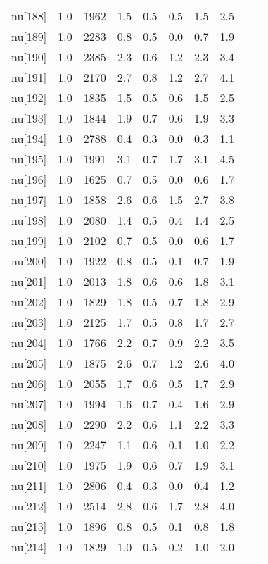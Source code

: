 \begin{longtable}{lrrrrrrr p{} | p{} |}
  nu[188] & 1.0 & 1962 & 1.5 & 0.5 & 0.5 & 1.5 & 2.5 \\ 
  nu[189] & 1.0 & 2283 & 0.8 & 0.5 & 0.0 & 0.7 & 1.9 \\ 
  nu[190] & 1.0 & 2385 & 2.3 & 0.6 & 1.2 & 2.3 & 3.4 \\ 
  nu[191] & 1.0 & 2170 & 2.7 & 0.8 & 1.2 & 2.7 & 4.1 \\ 
  nu[192] & 1.0 & 1835 & 1.5 & 0.5 & 0.6 & 1.5 & 2.5 \\ 
  nu[193] & 1.0 & 1844 & 1.9 & 0.7 & 0.6 & 1.9 & 3.3 \\ 
  nu[194] & 1.0 & 2788 & 0.4 & 0.3 & 0.0 & 0.3 & 1.1 \\ 
  nu[195] & 1.0 & 1991 & 3.1 & 0.7 & 1.7 & 3.1 & 4.5 \\ 
  nu[196] & 1.0 & 1625 & 0.7 & 0.5 & 0.0 & 0.6 & 1.7 \\ 
  nu[197] & 1.0 & 1858 & 2.6 & 0.6 & 1.5 & 2.7 & 3.8 \\ 
  nu[198] & 1.0 & 2080 & 1.4 & 0.5 & 0.4 & 1.4 & 2.5 \\ 
  nu[199] & 1.0 & 2102 & 0.7 & 0.5 & 0.0 & 0.6 & 1.7 \\ 
  nu[200] & 1.0 & 1922 & 0.8 & 0.5 & 0.1 & 0.7 & 1.9 \\ 
  nu[201] & 1.0 & 2013 & 1.8 & 0.6 & 0.6 & 1.8 & 3.1 \\ 
  nu[202] & 1.0 & 1829 & 1.8 & 0.5 & 0.7 & 1.8 & 2.9 \\ 
  nu[203] & 1.0 & 2125 & 1.7 & 0.5 & 0.8 & 1.7 & 2.7 \\ 
  nu[204] & 1.0 & 1766 & 2.2 & 0.7 & 0.9 & 2.2 & 3.5 \\ 
  nu[205] & 1.0 & 1875 & 2.6 & 0.7 & 1.2 & 2.6 & 4.0 \\ 
  nu[206] & 1.0 & 2055 & 1.7 & 0.6 & 0.5 & 1.7 & 2.9 \\ 
  nu[207] & 1.0 & 1994 & 1.6 & 0.7 & 0.4 & 1.6 & 2.9 \\ 
  nu[208] & 1.0 & 2290 & 2.2 & 0.6 & 1.1 & 2.2 & 3.3 \\ 
  nu[209] & 1.0 & 2247 & 1.1 & 0.6 & 0.1 & 1.0 & 2.2 \\ 
  nu[210] & 1.0 & 1975 & 1.9 & 0.6 & 0.7 & 1.9 & 3.1 \\ 
  nu[211] & 1.0 & 2806 & 0.4 & 0.3 & 0.0 & 0.4 & 1.2 \\ 
  nu[212] & 1.0 & 2514 & 2.8 & 0.6 & 1.7 & 2.8 & 4.0 \\ 
  nu[213] & 1.0 & 1896 & 0.8 & 0.5 & 0.1 & 0.8 & 1.8 \\ 
  nu[214] & 1.0 & 1829 & 1.0 & 0.5 & 0.2 & 1.0 & 2.0 \\ 

\end{longtable}
